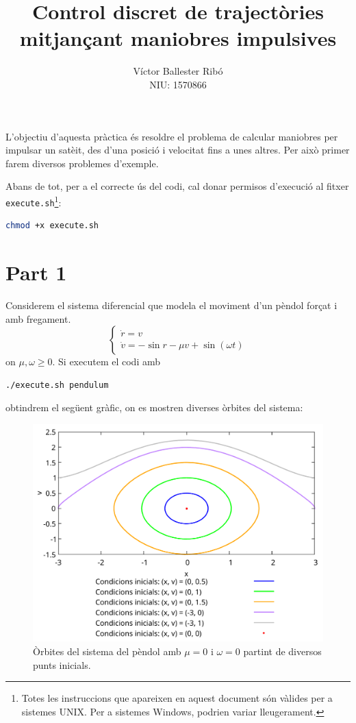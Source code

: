 \documentclass[10pt,a4paper]{article}
\title{\bfseries\Large Control discret de trajectòries mitjançant maniobres impulsives}
\author{Víctor Ballester Ribó\\NIU: 1570866}
\date{\parbox{\linewidth}{\centering
  Càlcul numèric\endgraf
  Grau en Matemàtiques\endgraf
  Universitat Autònoma de Barcelona\endgraf
  Juny de 2023}}
\theoremstyle{definition}
\theoremstyle{remark}
\begin{document}
\maketitle
L'objectiu d'aquesta pràctica és resoldre el problema de calcular maniobres per impulsar un satè\lgem it, des d'una posició i velocitat fins a unes altres. Per això primer farem diversos problemes d'exemple.

Abans de tot, per a el correcte ús del codi, cal donar permisos d'execució al fitxer \texttt{execute.sh}\footnote{Totes les instruccions que apareixen en aquest document són vàlides per a sistemes UNIX. Per a sistemes Windows, podrien variar lleugerament.}:
\begin{lstlisting}[language=Bash]
chmod +x execute.sh
\end{lstlisting}
\section*{Part 1}
Considerem el sistema diferencial que modela el moviment d'un pèndol forçat i amb fregament.
$$
  \begin{cases}
    \dot{r} = v \\
    \dot{v} = -\sin r - \mu v + \sin(\omega t)
  \end{cases}
$$
on $\mu,\omega\geq 0$. Si executem el codi amb
\begin{lstlisting}[language=Bash]
./execute.sh pendulum
\end{lstlisting}
obtindrem el següent gràfic, on es mostren diverses òrbites del sistema:
\begin{figure}[ht]
  \centering
  \includegraphics[width=0.69\linewidth]{Images/pendulum.pdf}
  \caption{Òrbites del sistema del pèndol amb $\mu=0$ i $\omega=0$ partint de diversos punts inicials.}
\end{figure}
\end{document}
